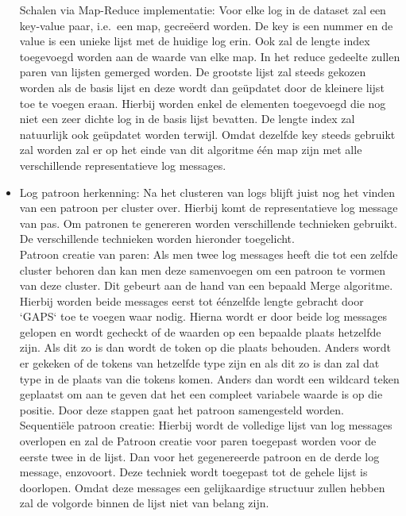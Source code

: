 \begin{itemize}
    \subitem Schalen via Map-Reduce implementatie: Voor elke log in de dataset zal een key-value paar, i.e.\ een map, gecreëerd worden. De key is een nummer en de value is een unieke lijst met de huidige log erin. Ook zal de lengte index toegevoegd worden aan de waarde van elke map. In het reduce gedeelte zullen paren van lijsten gemerged worden. De grootste lijst zal steeds gekozen worden als de basis lijst en deze wordt dan geüpdatet door de kleinere lijst toe te voegen eraan. Hierbij worden enkel de elementen toegevoegd die nog niet een zeer dichte log in de basis lijst bevatten. De lengte index zal natuurlijk ook geüpdatet worden terwijl. Omdat dezelfde key steeds gebruikt zal worden zal er op het einde van dit algoritme één map zijn met alle verschillende representatieve log messages. \\
    
    \item Log patroon herkenning: Na het clusteren van logs blijft juist nog het vinden van een patroon per cluster over. Hierbij komt de representatieve log message van pas. Om patronen te genereren worden verschillende technieken gebruikt. De verschillende technieken worden hieronder toegelicht.\\
    
    \subitem Patroon creatie van paren: Als men twee log messages heeft die tot een zelfde cluster behoren dan kan men deze samenvoegen om een patroon te vormen van deze cluster. Dit gebeurt aan de hand van een bepaald Merge algoritme. Hierbij worden beide messages eerst tot éénzelfde lengte gebracht door `GAPS` toe te voegen waar nodig. Hierna wordt er door beide log messages gelopen en wordt gecheckt of de waarden op een bepaalde plaats hetzelfde zijn. Als dit zo is dan wordt de token op die plaats behouden. Anders wordt er gekeken of de tokens van hetzelfde type zijn en als dit zo is dan zal dat type in de plaats van die tokens komen. Anders dan wordt een wildcard teken geplaatst om aan te geven dat het een compleet variabele waarde is op die positie. Door deze stappen gaat het patroon samengesteld worden.\\
    
    \subitem Sequentiële patroon creatie: Hierbij wordt de volledige lijst van log messages overlopen en zal de Patroon creatie voor paren toegepast worden voor de eerste twee in de lijst. Dan voor het gegenereerde patroon en de derde log message, enzovoort. Deze techniek wordt toegepast tot de gehele lijst is doorlopen. Omdat deze messages een gelijkaardige structuur zullen hebben zal de volgorde binnen de lijst niet van belang zijn.\\
    

\end{itemize}
